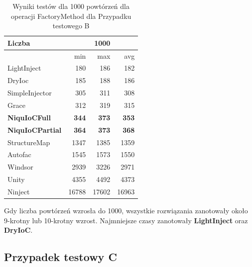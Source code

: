 \documentclass[12pt]{article}
\begin{document}
\begin{table}[H]
\captionsetup{belowskip=0pt,aboveskip=0pt}
\begin{center}
\begin{small}
	\begin{tabular}{ | l | r r r | }
    		\hline
Liczba & & 1000 & \\ \hline
 & min & max & avg \\ \hline
LightInject & 180 & 186 & 182 \\ \hline
DryIoc & 185 & 188 & 186 \\ \hline
SimpleInjector & 305 & 311 & 308 \\ \hline
Grace & 312 & 319 & 315 \\ \hline
\textbf{NiquIoCFull} & \textbf{344} & \textbf{373} & \textbf{353} \\ \hline
\textbf{NiquIoCPartial} & \textbf{364} & \textbf{373} & \textbf{368} \\ \hline
StructureMap & 1347 & 1385 & 1359 \\ \hline
Autofac & 1545 & 1573 & 1550 \\ \hline
Windsor & 2939 & 3226 & 2971 \\ \hline
Unity & 4355 & 4492 & 4373 \\ \hline
Ninject & 16788 & 17602 & 16963 \\ \hline
  	\end{tabular}
\end{small}
\end{center}
\caption{Wyniki testów dla 1000 powtórzeń dla operacji FactoryMethod dla Przypadku testowego B}
\label{TestCaseB_FactoryMethod1000}
\end{table}
Gdy liczba powtórzeń wzrosła do 1000, wszystkie rozwiązania zanotowały około 9-krotny lub 10-krotny wzrost. Najmniejsze czasy zanotowały \textbf{LightInject} oraz \textbf{DryIoC}.


\subsection{Przypadek testowy C}
\end{document}
